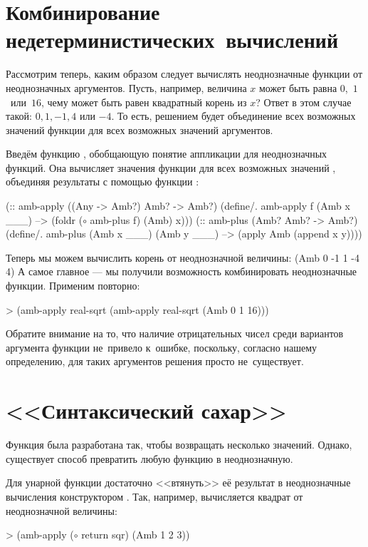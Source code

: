 \section[4]{Комбинирование недетерминистических~вычислений}%
Рассмотрим теперь, каким образом следует вычислять неоднозначные функции от неоднозначных аргументов. Пусть, например, величина $x$ может быть равна \mbox{$0$, $1$ или $16$}, чему может быть равен квадратный корень из $x$? Ответ в этом случае такой: $0, 1, -1, 4$ или $-4$. То есть, решением будет объединение всех возможных значений функции для всех возможных значений аргументов.

Введём функцию , обобщающую понятие аппликации для неоднозначных функций. Она вычисляет значения функции  для всех возможных значений , объединяя результаты с помощью функции :
\begin{Definition}[emph={x,f}]
(:: amb-apply ((Any -> Amb?) Amb? -> Amb?)
  (define/. amb-apply
    f (Amb x ___) --> (foldr ($\circ$ amb-plus f) (Amb) x)))%
(:: amb-plus (Amb? Amb? -> Amb?)
  (define/. amb-plus
    (Amb x ___) (Amb y ___) --> (apply Amb (append x y))))
\end{Definition}

\newpage\noindent
Теперь мы можем вычислить корень от неоднозначной \mbox{величины:}\smallskip
{}
     {(Amb 0 -1 1 -4 4)}
\noindent А самое главное --- мы получили возможность комбинировать неоднозначные функции. Применим  повторно:
\begin{SchemeCode}
  > (amb-apply real-sqrt 
               (amb-apply real-sqrt (Amb 0 1 16)))
\end{SchemeCode}\vspace{-\smallskipamount}
Обратите внимание на то, что наличие отрицательных чисел среди вариантов аргумента функции  не~привело к~ошибке, поскольку, согласно нашему определению, для таких аргументов решения просто не~существует.

\section{<<Синтаксический сахар>>}%
Функция  была разработана так, чтобы возвращать несколько значений. Однако, существует способ превратить любую функцию в неоднозначную. 

Для унарной функции достаточно <<втянуть>> её результат в неоднозначные вычисления конструктором . Так, например, вычисляется квадрат от неоднозначной величины:
\begin{SchemeCode}
   > (amb-apply ($\circ$ return sqr) (Amb 1 2 3))
\end{SchemeCode}\vspace{-\medskipamount}

